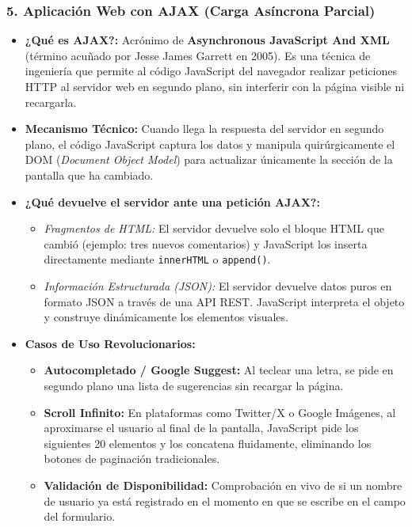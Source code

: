 \subsubsection{5. Aplicación Web con AJAX (Carga Asíncrona Parcial)}
\begin{itemize}[leftmargin=1.2cm]
  \item \textbf{¿Qué es AJAX?:} Acrónimo de \textbf{Asynchronous JavaScript And XML} (término acuñado por Jesse James Garrett en 2005). Es una técnica de ingeniería que permite al código JavaScript del navegador realizar peticiones HTTP al servidor web en segundo plano, sin interferir con la página visible ni recargarla.
  \item \textbf{Mecanismo Técnico:} Cuando llega la respuesta del servidor en segundo plano, el código JavaScript captura los datos y manipula quirúrgicamente el DOM (\textit{Document Object Model}) para actualizar únicamente la sección de la pantalla que ha cambiado.
  \item \textbf{¿Qué devuelve el servidor ante una petición AJAX?:}
    \begin{itemize}
      \item \textit{Fragmentos de HTML:} El servidor devuelve solo el bloque HTML que cambió (ejemplo: tres nuevos comentarios) y JavaScript los inserta directamente mediante \texttt{innerHTML} o \texttt{append()}.
      \item \textit{Información Estructurada (JSON):} El servidor devuelve datos puros en formato JSON a través de una API REST. JavaScript interpreta el objeto y construye dinámicamente los elementos visuales.
    \end{itemize}
  \item \textbf{Casos de Uso Revolucionarios:}
    \begin{itemize}
      \item \textbf{Autocompletado / Google Suggest:} Al teclear una letra, se pide en segundo plano una lista de sugerencias sin recargar la página.
      \item \textbf{Scroll Infinito:} En plataformas como Twitter/X o Google Imágenes, al aproximarse el usuario al final de la pantalla, JavaScript pide los siguientes 20 elementos y los concatena fluidamente, eliminando los botones de paginación tradicionales.
      \item \textbf{Validación de Disponibilidad:} Comprobación en vivo de si un nombre de usuario ya está registrado en el momento en que se escribe en el campo del formulario.
    \end{itemize}
\end{itemize}

